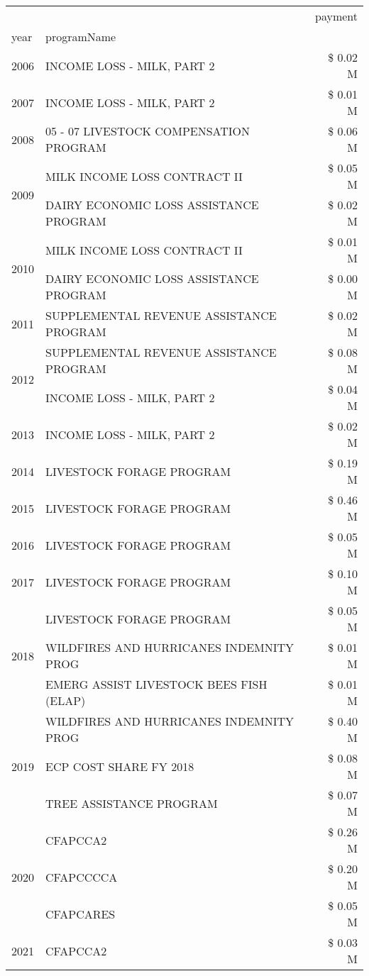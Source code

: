 \begin{tabular}{llr}
\toprule
 &  & payment \\
year & programName &  \\
\midrule
2006 & INCOME LOSS - MILK, PART 2 & \$ 0.02 M \\
\cline{1-3}
2007 & INCOME LOSS - MILK, PART 2 & \$ 0.01 M \\
\cline{1-3}
2008 & 05 - 07 LIVESTOCK COMPENSATION PROGRAM & \$ 0.06 M \\
\cline{1-3}
\multirow[t]{2}{*}{2009} & MILK INCOME LOSS CONTRACT II & \$ 0.05 M \\
 & DAIRY ECONOMIC LOSS ASSISTANCE PROGRAM & \$ 0.02 M \\
\cline{1-3}
\multirow[t]{2}{*}{2010} & MILK INCOME LOSS CONTRACT II & \$ 0.01 M \\
 & DAIRY ECONOMIC LOSS ASSISTANCE PROGRAM & \$ 0.00 M \\
\cline{1-3}
2011 & SUPPLEMENTAL REVENUE ASSISTANCE PROGRAM & \$ 0.02 M \\
\cline{1-3}
\multirow[t]{2}{*}{2012} & SUPPLEMENTAL REVENUE ASSISTANCE PROGRAM & \$ 0.08 M \\
 & INCOME LOSS - MILK, PART 2 & \$ 0.04 M \\
\cline{1-3}
2013 & INCOME LOSS - MILK, PART 2 & \$ 0.02 M \\
\cline{1-3}
2014 & LIVESTOCK FORAGE PROGRAM & \$ 0.19 M \\
\cline{1-3}
2015 & LIVESTOCK FORAGE PROGRAM & \$ 0.46 M \\
\cline{1-3}
2016 & LIVESTOCK FORAGE PROGRAM                      & \$ 0.05 M \\
\cline{1-3}
2017 & LIVESTOCK FORAGE PROGRAM & \$ 0.10 M \\
\cline{1-3}
\multirow[t]{3}{*}{2018} & LIVESTOCK FORAGE PROGRAM & \$ 0.05 M \\
 & WILDFIRES AND HURRICANES INDEMNITY PROG & \$ 0.01 M \\
 & EMERG ASSIST LIVESTOCK BEES FISH (ELAP) & \$ 0.01 M \\
\cline{1-3}
\multirow[t]{3}{*}{2019} & WILDFIRES AND HURRICANES INDEMNITY PROG & \$ 0.40 M \\
 & ECP COST SHARE FY 2018 & \$ 0.08 M \\
 & TREE ASSISTANCE PROGRAM & \$ 0.07 M \\
\cline{1-3}
\multirow[t]{3}{*}{2020} & CFAPCCA2 & \$ 0.26 M \\
 & CFAPCCCCA & \$ 0.20 M \\
 & CFAPCARES & \$ 0.05 M \\
\cline{1-3}
2021 & CFAPCCA2 & \$ 0.03 M \\
\cline{1-3}
\bottomrule
\end{tabular}

